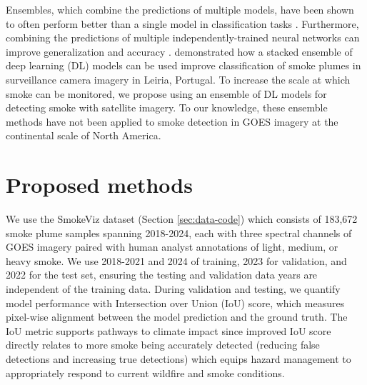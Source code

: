 \documentclass{article}
\begin{document}
Ensembles, which combine the predictions of multiple models, have been shown to often perform better than a single model in classification tasks \citep{ensemble-ml, ensemble-diversity}.  Furthermore, combining the predictions of multiple independently-trained neural networks can improve generalization and accuracy \citep{nn-ensemble,nn-ensemble2, nn-error-ens}. \citep{stacking-smoke-falcao} demonstrated how a stacked ensemble of deep learning (DL) models can be used improve classification of smoke plumes in surveillance camera imagery in Leiria, Portugal. To increase the scale at which smoke can be monitored, we propose using an ensemble of DL models for detecting smoke with satellite imagery. To our knowledge, these ensemble methods have not been applied to smoke detection in GOES imagery at the continental scale of North America.

\section{Proposed methods} 
We use the SmokeViz dataset (Section \ref{sec:data-code}) which consists of 183,672 smoke plume samples spanning 2018-2024, each with three spectral channels of GOES imagery paired with human analyst annotations of light, medium, or heavy smoke. We use 2018-2021 and 2024 of training, 2023 for validation, and 2022 for the test set, ensuring the testing and validation data years are independent of the training data. During validation and testing, we quantify model performance with Intersection over Union (IoU) score, which measures pixel-wise alignment between the model prediction and the ground truth. The IoU metric supports pathways to climate impact since improved IoU score directly relates to more smoke being accurately detected (reducing false detections and increasing true detections) which equips hazard management to appropriately respond to current wildfire and smoke conditions.
\end{document}
